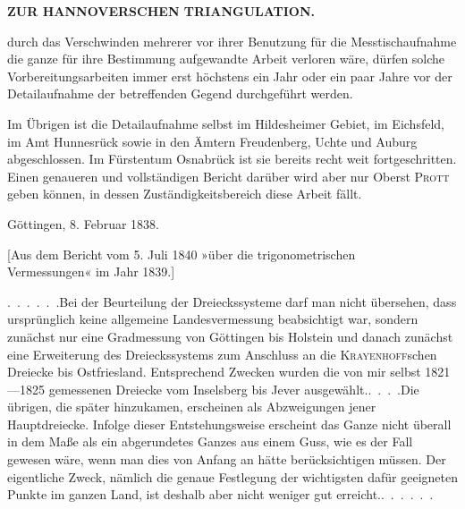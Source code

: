 \par\clearpage
\noindent\null\hfill{\small\textbf{ZUR HANNOVERSCHEN TRIANGULATION.}}\hfill{}\par\medskip

\noindent durch das Verschwinden mehrerer vor ihrer Benutzung für die Messtischaufnahme die ganze für ihre Bestimmung aufgewandte Arbeit verloren wäre, dürfen solche Vorbereitungsarbeiten immer erst höchstens ein Jahr oder ein paar Jahre vor der Detailaufnahme der betreffenden Gegend durchgeführt werden.

\par\noindent\hspace*{\parindent}Im Übrigen ist die Detailaufnahme selbst im Hildesheimer Gebiet, im Eichsfeld, im Amt Hunnesrück sowie in den Ämtern Freudenberg, Uchte und Auburg abgeschlossen. Im Fürstentum Osnabrück ist sie bereits recht weit fortgeschritten. Einen genaueren und vollständigen Bericht darüber wird aber nur Oberst \textsc{Prott} geben können, in dessen Zuständigkeitsbereich diese Arbeit fällt.

\par\noindent\hspace*{\parindent}Göttingen, 8. Februar 1838.

\par\medskip
\begin{center}
[Aus dem Bericht vom 5. Juli 1840 »über die trigonometrischen\\
Vermessungen« im Jahr 1839.]
\end{center}

\par\noindent\hspace*{\parindent}\mbox{.\ .\ .\ .\ .\ .}\quad Bei der Beurteilung der Dreieckssysteme darf man nicht übersehen, dass ursprünglich keine allgemeine Landesvermessung beabsichtigt war, sondern zunächst nur eine Gradmessung von Göttingen bis Holstein und danach zunächst eine Erweiterung des Dreieckssystems zum Anschluss an die \textsc{Krayenhoff}schen Dreiecke bis Ostfriesland. Entsprechend  Zwecken wurden die von mir selbst 1821---1825 gemessenen Dreiecke vom Inselsberg bis Jever \mbox{ausgewählt.\enspace\mbox{.\ .\ .\ .}}\quad Die übrigen, die später hinzukamen, erscheinen als Abzweigungen jener Hauptdreiecke. Infolge dieser Entstehungsweise erscheint das Ganze nicht überall in dem Maße als ein abgerundetes Ganzes aus einem Guss, wie es der Fall gewesen wäre, wenn man dies von Anfang an hätte berücksichtigen müssen. Der eigentliche Zweck, nämlich die genaue Festlegung der wichtigsten dafür geeigneten Punkte im ganzen Land, ist deshalb aber nicht weniger gut \mbox{erreicht.\enspace\mbox{.\ .\ .\ .\ .\ .}}


